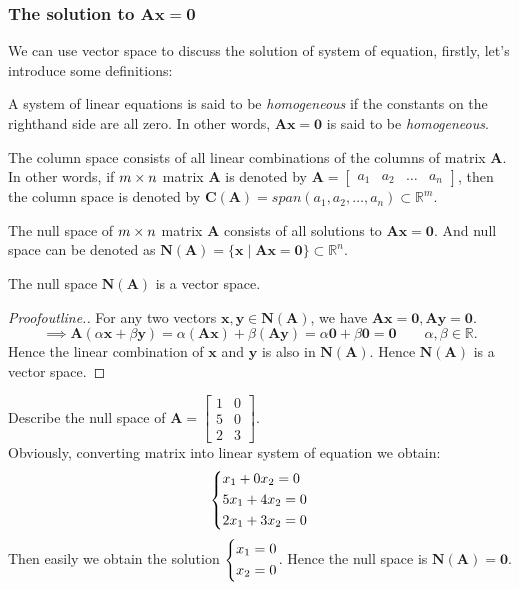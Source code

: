 \subsubsection{The solution to $\bm{Ax}= \bm 0$}
We can use vector space to discuss the solution of system of equation, firstly, let's introduce some definitions:
\begin{definition}
A system of linear equations is said to be \emph{homogeneous} if the constants on the righthand
side are all zero. In other words, $\bm{Ax} = \bm 0$ is said to be \emph{homogeneous}.
\end{definition}
\begin{definition}
The column space consists of all linear combinations of the columns of matrix $\bm A$. In other words, if $m\times n$ matrix $\bm A$ is denoted by $\bm A = \left[
\begin{array}{c|c|c|c}
a_1&a_2&\ldots&a_n
\end{array}\right]$, then the column space is denoted by $\bm C(\bm A) = span(a_1,a_2,\dots,a_n)\subset\mathbb{R}^{m}$.
\end{definition}
\begin{definition}
The null space of $m\times n$ matrix $\bm A$ consists of all solutions to $\bm{Ax} = \bm 0$. And null space can be denoted as $\bm N(\bm A) = \{\bm x\mid\bm{Ax} = \bm 0\}\subset\mathbb{R}^{n}$.
\end{definition}
\begin{proposition}
The null space $\bm N(\bm A)$ is a vector space.
\end{proposition}
\begin{proof}[Proofoutline.]
For any two vectors $\bm x,\bm y\in\bm N(\bm A)$, we have $\bm{Ax} = \bm 0,\bm{Ay} = \bm 0$.\\
\[\implies \bm A(\alpha\bm x +\beta\bm y) = \alpha(\bm{Ax})+\beta(\bm{Ay}) = \alpha\bm 0+\beta\bm 0 = \bm 0\qquad \alpha,\beta\in\mathbb{R}.\]
Hence the linear combination of $\bm x$ and $\bm y$ is also in $\bm N(\bm A)$. Hence $\bm N(\bm A)$ is a vector space.
\end{proof}
\begin{example}
Describe the null space of $\bm A = \begin{bmatrix}
1&0\\5&0\\2&3
\end{bmatrix}.$\\
Obviously, converting matrix into linear system of equation we obtain:
\[
\left\{\begin{lgathered}
x_1+0x_2=0\\5x_1+4x_2=0\\2x_1+3x_2=0
\end{lgathered}\right.
\]
Then easily we obtain the solution $\left\{\begin{lgathered}
x_1=0\\x_2=0
\end{lgathered}\right.$. Hence the null space is $\bm N(\bm A) = \bm 0$.
\end{example}
